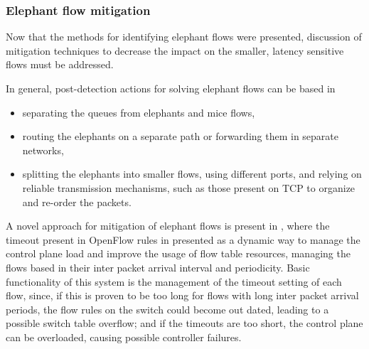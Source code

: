 \subsubsection{Elephant flow mitigation}

Now that the methods for identifying elephant flows were presented, discussion of mitigation techniques to decrease the impact on the smaller, latency sensitive
flows must be addressed. 

\par In general, post-detection actions for solving elephant flows can be based in \cite{pettit_open_2014, noauthor_mice_2013}

\begin{itemize}
    \item separating the queues from elephants and mice flows,
    \item routing the elephants on a separate path or forwarding them in separate networks,
    \item splitting the elephants into smaller flows, using different ports, and relying on reliable transmission mechanisms, such as those present on TCP
        to organize and re-order the packets.
\end{itemize}

\par A novel approach for mitigation of elephant flows is present in \cite{zhu_intelligent_2015}, where the timeout present in OpenFlow rules in presented as 
a dynamic way to manage the control plane load and improve the usage of flow table resources, managing the flows based in their inter packet arrival interval and
periodicity. Basic functionality of this system is the management of the timeout setting of each flow, since, if this is proven to be too long for flows with 
long inter packet arrival periods, the flow rules on the switch could become out dated, leading to a possible switch table overflow; and if the timeouts are 
too short, the control plane can be overloaded, causing possible controller failures.

